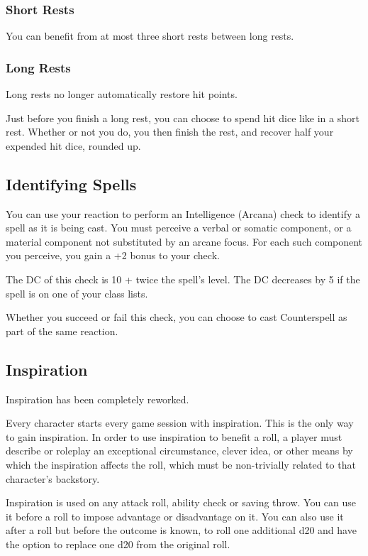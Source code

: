 \documentclass[letterpaper,twocolumn,openany,nodeprecatedcode]{dndbook}
\begin{document}
\subsubsection{Short Rests}
You can benefit from at most three short rests between long rests.

\subsubsection{Long Rests}
Long rests no longer automatically restore hit points.

Just before you finish a long rest, you can choose to spend hit dice like in a short rest. Whether or not you do, you then finish the rest, and recover half your expended hit dice, rounded up.

\subsection{Identifying Spells}
You can use your reaction to perform an Intelligence (Arcana) check to identify a spell as it is being cast. You must perceive a verbal or somatic component, or a material component not substituted by an arcane focus. For each such component you perceive, you gain a +2 bonus to your check.

The DC of this check is 10 + twice the spell's level. The DC decreases by 5 if the spell is on one of your class lists. 

Whether you succeed or fail this check, you can choose to cast Counterspell as part of the same reaction.

\subsection{Inspiration}
Inspiration has been completely reworked.

Every character starts every game session with inspiration. This is the only way to gain inspiration. In order to use inspiration to benefit a roll, a player must describe or roleplay an exceptional circumstance, clever idea, or other means by which the inspiration affects the roll, which must be non-trivially related to that character's backstory.

Inspiration is used on any attack roll, ability check or saving throw. You can use it before a roll to impose advantage or disadvantage on it. You can also use it after a roll but before the outcome is known, to roll one additional d20 and have the option to replace one d20 from the original roll. 
\end{document}

